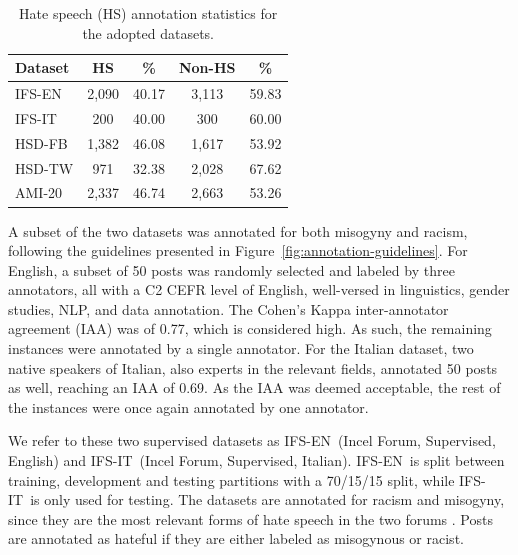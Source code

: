 \documentclass[11pt]{article}
\newcommand{\dsENclassification}{IFS-EN}
\newcommand{\dsITclassification}{IFS-IT}
\newcommand{\hsdfb}{\mbox{HSD-FB}}
\newcommand{\hsdtw}{\mbox{HSD-TW}}
\newcommand{\ami}{\mbox{AMI-20}}
\begin{document}
\begin{table}[t]
  \caption{Hate speech (HS) annotation statistics for the adopted datasets.}
  \label{tab:english-italian-supervised-datasets-partition-stats}
  \centering
  \begin{tabular}{l|cc|cc}
  \hline
  \bf Dataset                          & \bf HS & \bf \% & \bf Non-HS & \bf \%  \\ 
  \hline
  \dsENclassification                 	&  2,090 & 40.17  &   3,113    &  59.83 \\ 
  \dsITclassification                   &  200   & 40.00  &   300      &  60.00 \\ 
  \hsdfb                              	&  1,382 & 46.08  &   1,617    &  53.92 \\ 
  \hsdtw                              	&  971   & 32.38  &   2,028    &  67.62 \\ 
  \ami\,                                	&  2,337 & 46.74  &   2,663    &  53.26 \\ 
  \hline
  \end{tabular}
\end{table}

A subset of the two datasets was annotated for both misogyny and racism, following the guidelines presented in Figure~\ref{fig:annotation-guidelines}.
For English, a subset of 50 posts was randomly selected and labeled by three annotators, all with a C2 CEFR level of English, well-versed in linguistics, gender studies, NLP, and data annotation. 
The Cohen's Kappa inter-annotator agreement (IAA) \cite{bobicev2017inter} was of 0.77, which is considered high.
As such, the remaining instances were annotated by a single annotator. For the Italian dataset, two native speakers of Italian, also experts in the relevant fields, annotated  50 posts as well, reaching an IAA of 0.69. As the IAA was deemed acceptable, the rest of the instances were once again annotated by one annotator. 

We refer to these two supervised datasets as \dsENclassification\, (Incel Forum, Supervised, English) and \dsITclassification\, (Incel Forum, Supervised, Italian). \dsENclassification~is split between training, development and testing partitions with a 70/15/15 split, while \dsITclassification~is only used for testing.
The datasets are annotated for racism and misogyny, since they are the most relevant forms of hate speech in the two forums \cite{silva2016analyzing,ging2018special}. Posts are annotated as hateful if they are either labeled as misogynous or racist.
\end{document}

